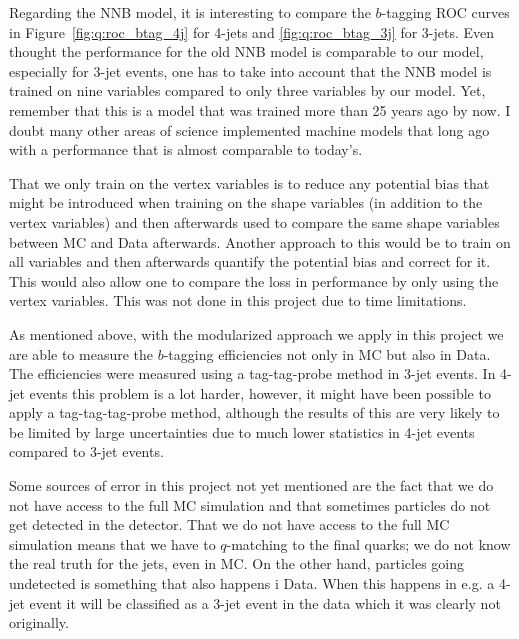 Regarding the NNB model, it is interesting to compare the $b$-tagging ROC curves in Figure~\ref{fig:q:roc_btag_4j} for 4-jets and \ref{fig:q:roc_btag_3j} for 3-jets. Even thought the performance for the old NNB model is comparable to our model, especially for 3-jet events, one has to take into account that the NNB model is trained on nine variables compared to only three variables by our model. Yet, remember that this is a model that was trained more than \num{25} years ago by now. I doubt many other areas of science implemented machine models that long ago with a performance that is almost comparable to today's.

That we only train on the vertex variables is to reduce any potential bias that might be introduced when training on the shape variables (in addition to the vertex variables) and then afterwards used to compare the same shape variables between MC and Data afterwards. Another approach to this would be to train on all variables and then afterwards quantify the potential bias and correct for it. This would also allow one to compare the loss in performance by only using the vertex variables. This was not done in this project due to time limitations.

As mentioned above, with the modularized approach we apply in this project we are able to measure the $b$-tagging efficiencies not only in MC but also in Data. The efficiencies were measured using a tag-tag-probe method in 3-jet events. In 4-jet events this problem is a lot harder, however, it might have been possible to apply a tag-tag-tag-probe method, although the results of this are very likely to be limited by large uncertainties due to much lower statistics in 4-jet events compared to 3-jet events. 

Some sources of error in this project not yet mentioned are the fact that we do not have access to the full MC simulation and that sometimes particles do not get detected in the detector. That we do not have access to the full MC simulation means that we have to $q$-matching to the final quarks; we do not know the real truth for the jets, even in MC. On the other hand, particles going undetected is something that also happens i Data. When this happens in e.g. a 4-jet event it will be classified as a 3-jet event in the data which it was clearly not originally. 


